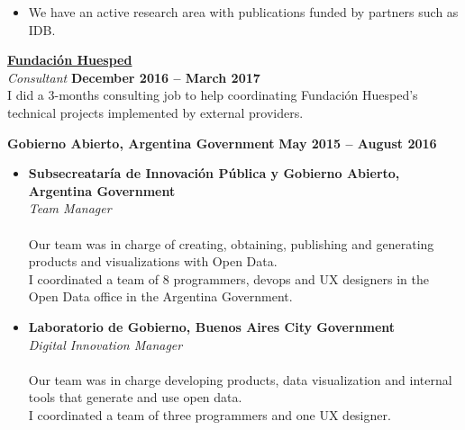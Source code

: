 \documentclass[margin,line]{resume}
\begin{document}
\begin{resume}
\begin{itemize}
\item We have an active research area with publications funded by partners such as IDB.

\end{itemize}

\vspace{-5mm}
\textbf{\href{https://www.huesped.org.ar/}{Fundaci\'on Huesped}}\\\vspace{1mm}
\textsl{Consultant} \hfill \textbf{December 2016 -- March 2017}
\\
I did a 3-months consulting job to help coordinating Fundaci\'on Huesped's technical projects implemented by external providers.


\textbf{Gobierno Abierto, Argentina Government}\vspace{2mm}\vspace{1mm} \hfill \textbf{May 2015 -- August 2016}\vspace{-3mm}\\\vspace{-1mm}

\begin{itemize}
\item \textbf{Subsecreatar\'ia de Innovaci\'on P\'ublica y Gobierno Abierto, Argentina Government}\vspace{2mm}\\\vspace{1mm}
\textsl{Team Manager} \hfill \vspace{-3mm}\\\vspace{-1mm}
\\
Our team was in charge of creating, obtaining, publishing and generating products and visualizations with Open Data.
\\
I coordinated a team of 8 programmers, devops and UX designers in the Open Data office in the Argentina Government. 


\item \textbf{Laboratorio de Gobierno, Buenos Aires City Government}\vspace{2mm}\\\vspace{1mm}
\textsl{Digital Innovation Manager} \hfill \vspace{-3mm}\\\vspace{-1mm}
\\
Our team was in charge developing products, data visualization and internal tools that generate and use open data.
\\
I coordinated a team of three programmers and one UX designer. 


\end{itemize}
\end{resume}
\end{document}
